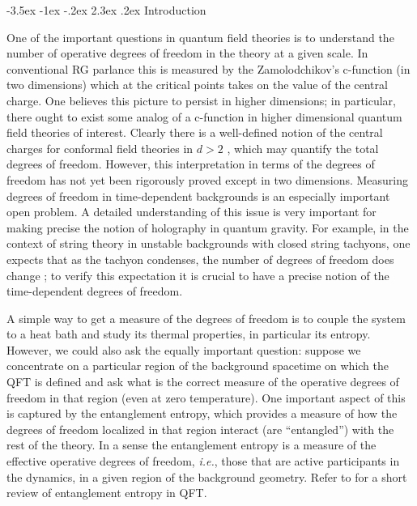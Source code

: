 \documentclass[12pt]{article}
\makeatletter
\renewcommand\section{\@startsection {section}{1}{\z@}%
                                   {-3.5ex \@plus -1ex \@minus -.2ex}%
                                   {2.3ex \@plus.2ex}%
                                   {\normalfont\large\bfseries}}
\def\ie{{\it i.e.}}
\makeatother
\begin{document}
\section{Introduction}
 \label{intro}

\hspace{5mm} One of the important questions in quantum field
theories  is to understand the number of operative degrees of
freedom  in the theory at a given scale. In conventional RG parlance
this is measured by the Zamolodchikov's c-function (in two
dimensions) \cite{Zamolodchikov:1986gt}   which at the critical
points takes on the value of the central charge. One believes this
picture to persist in higher dimensions; in particular, there  ought
to exist some analog of a c-function in higher dimensional quantum
field theories of interest. Clearly there is a well-defined notion
of the central charges  for conformal field theories in $d >2$
\cite{Cardy:1988cw}, which may quantify  the total degrees of
freedom. However, this interpretation in terms of the degrees of
freedom has not yet been rigorously proved  except in two
dimensions.  Measuring degrees of freedom in
time-dependent backgrounds is an especially important open problem. A
detailed understanding of this issue   is very important for making
precise the notion of holography in quantum  gravity. For example,
in the context of string theory in unstable backgrounds  with closed
string tachyons, one expects that as the tachyon condenses,  the
number of degrees of freedom does change \cite{Nishioka:2006gr}; to
verify this expectation it is crucial to have a precise notion of
the time-dependent degrees of  freedom.

A simple way to get a measure of the degrees of freedom is to couple
the system
 to a heat bath and study its thermal properties, in particular
its entropy. However, we could  also ask the equally important
question: suppose we concentrate on a particular region of the
background spacetime on which the QFT is defined and ask what is the
correct measure of the operative degrees of freedom in that region
(even at zero temperature).  One important aspect of this is
captured by the entanglement entropy, which provides a measure of
how the degrees of freedom localized in that region interact (are
``entangled'') with the rest of the theory. In a sense the
entanglement entropy is a measure of the effective operative degrees
of freedom, \ie, those that are active participants in the dynamics,
in a given region of the background geometry.  Refer to
\cite{Calabrese:2005zw} for a short review of entanglement entropy
in QFT.
\end{document}
